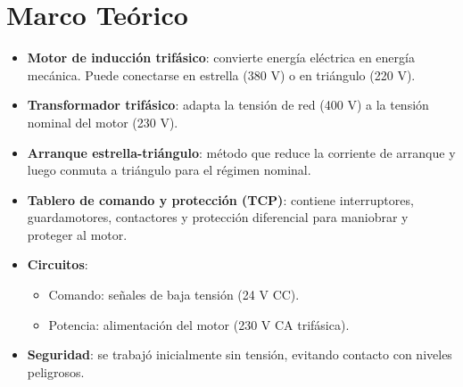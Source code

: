 \section{Marco Teórico}
\begin{itemize}
    \item \textbf{Motor de inducción trifásico}: convierte energía eléctrica en energía mecánica. Puede conectarse en estrella (380 V) o en triángulo (220 V).
    \item \textbf{Transformador trifásico}: adapta la tensión de red (400 V) a la tensión nominal del motor (230 V).
    \item \textbf{Arranque estrella-triángulo}: método que reduce la corriente de arranque y luego conmuta a triángulo para el régimen nominal.
    \item \textbf{Tablero de comando y protección (TCP)}: contiene interruptores, guardamotores, contactores y protección diferencial para maniobrar y proteger al motor.
    \item \textbf{Circuitos}: 
    \begin{itemize}
        \item Comando: señales de baja tensión (24 V CC).
        \item Potencia: alimentación del motor (230 V CA trifásica).
    \end{itemize}
    \item \textbf{Seguridad}: se trabajó inicialmente sin tensión, evitando contacto con niveles peligrosos.
\end{itemize}
